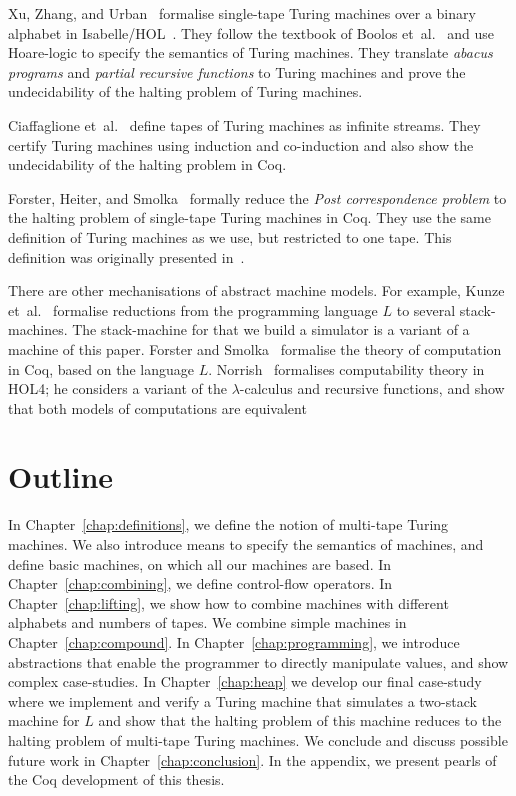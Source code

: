 Xu, Zhang, and Urban~\cite{Xu:2013:MTM:2529315.2529331} formalise single-tape Turing machines over a binary alphabet in
Isabelle/HOL~\cite{nipkow2002isabelle}.  They follow the textbook of Boolos et~al.~\cite{boolos2007computability} and use Hoare-logic to specify the
semantics of Turing machines.  They translate \textit{abacus programs} and \textit{partial recursive functions} to Turing machines and prove the
undecidability of the halting problem of Turing machines.

Ciaffaglione et~al.~\cite{Ciaffaglione:2016:TTC:2956213.2956306} define tapes of Turing machines as infinite streams.  They certify Turing machines
using induction and co-induction and also show the undecidability of the halting problem in Coq.

Forster, Heiter, and Smolka~\cite{PCPITP} formally reduce the \textit{Post correspondence problem} to the halting problem of single-tape Turing
machines in Coq.  They use the same definition of Turing machines as we use, but restricted to one tape.  This definition was originally presented
in~\cite{asperti2012}.

There are other mechanisations of abstract machine models.  For example, Kunze et~al.~\cite{KunzeEtAl:2018:Formal} formalise reductions from the
programming language $L$ to several stack-machines.  The stack-machine for that we build a simulator is a variant of a machine of this paper.  Forster
and Smolka~\cite{ForsterSmolka17} formalise the theory of computation in Coq, based on the language $L$.  Norrish~\cite{NorrishComputabilityTheory}
formalises computability theory in HOL4; he considers a variant of the $\lambda$-calculus and recursive functions, and show that both models of
computations are equivalent



\section{Outline}
\label{sec:outline}

In Chapter~\ref{chap:definitions}, we define the notion of multi-tape Turing machines.  We also introduce means to specify the semantics of machines,
and define basic machines, on which all our machines are based.  In Chapter~\ref{chap:combining}, we define control-flow operators.  In
Chapter~\ref{chap:lifting}, we show how to combine machines with different alphabets and numbers of tapes.  We combine simple machines in
Chapter~\ref{chap:compound}.  In Chapter~\ref{chap:programming}, we introduce abstractions that enable the programmer to directly manipulate values,
and show complex case-studies.  In Chapter~\ref{chap:heap} we develop our final case-study where we implement and verify a Turing machine that
simulates a two-stack machine for $L$ and show that the halting problem of this machine reduces to the halting problem of multi-tape Turing machines.
We conclude and discuss possible future work in Chapter~\ref{chap:conclusion}.  In the appendix, we present pearls of the Coq development of this
thesis.

